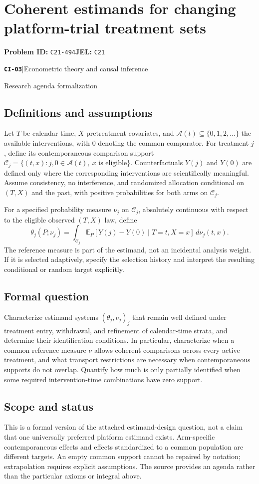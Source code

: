 \documentclass[11pt,a4paper]{article}
\newcommand{\E}{\mathbb E}
\newcommand{\entrymeta}[3]{{\sffamily\small\color{muted}\textbf{\texttt{#1}}\quad|\quad #2\par #3\par}}
\begin{document}
\section*{Coherent estimands for changing platform-trial treatment sets}
\textbf{Problem ID:} \texttt{C21-494}\quad \textbf{JEL:} \texttt{C21}\par
\label{problem:OP-0482}
\label{beyond:CI-03}
\entrymeta{CI-03}{Econometric theory and causal inference}{Research agenda formalization}
\subsection*{Definitions and assumptions}
Let $T$ be calendar time, $X$ pretreatment covariates, and $\mathcal A(t)\subseteq\{0,1,2,\ldots\}$ the available interventions, with $0$ denoting the common comparator. For treatment $j$, define its contemporaneous comparison support
$\mathcal C_j=\{(t,x):j,0\in\mathcal A(t),\ x\text{ is eligible}\}$.
Counterfactuals $Y(j)$ and $Y(0)$ are defined only where the corresponding interventions are scientifically meaningful. Assume consistency, no interference, and randomized allocation conditional on $(T,X)$ and the past, with positive probabilities for both arms on $\mathcal C_j$.

For a specified probability measure $\nu_j$ on $\mathcal C_j$, absolutely continuous with respect to the eligible observed $(T,X)$ law, define
\[
\theta_j(P;\nu_j)=\int_{\mathcal C_j}
 \E_P[Y(j)-Y(0)\mid T=t,X=x]\,d\nu_j(t,x).
\]
The reference measure is part of the estimand, not an incidental analysis weight. If it is selected adaptively, specify the selection history and interpret the resulting conditional or random target explicitly.
\subsection*{Formal question}
Characterize estimand systems $(\theta_j,\nu_j)_j$ that remain well defined under treatment entry, withdrawal, and refinement of calendar-time strata, and determine their identification conditions. In particular, characterize when a common reference measure $\nu$ allows coherent comparisons across every active treatment, and what transport restrictions are necessary when contemporaneous supports do not overlap. Quantify how much is only partially identified when some required intervention-time combinations have zero support.
\subsection*{Scope and status}
This is a formal version of the attached estimand-design question, not a claim that one universally preferred platform estimand exists. Arm-specific contemporaneous effects and effects standardized to a common population are different targets. An empty common support cannot be repaired by notation; extrapolation requires explicit assumptions. The source provides an agenda rather than the particular axioms or integral above.
\end{document}
